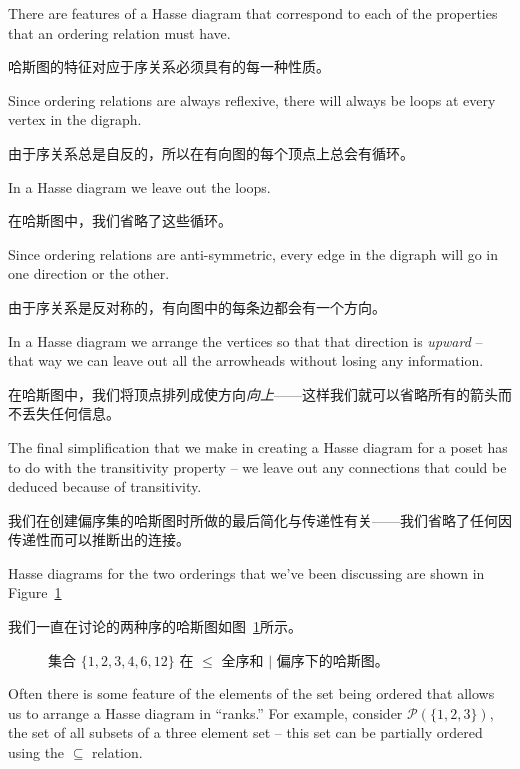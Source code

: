 There
are features of a Hasse diagram that correspond to each of the 
properties that an ordering relation must have.

哈斯图的特征对应于序关系必须具有的每一种性质。

Since ordering relations are always reflexive, there will always 
be loops at every vertex in the digraph.

由于序关系总是自反的，所以在有向图的每个顶点上总会有循环。

In a Hasse diagram we
leave out the loops.

在哈斯图中，我们省略了这些循环。

Since ordering relations are anti-symmetric, every edge in the digraph
will go in one direction or the other.

由于序关系是反对称的，有向图中的每条边都会有一个方向。

In a Hasse diagram we arrange
the vertices so that that direction is \emph{upward} -- that way we
can leave out all the arrowheads without losing any information.

在哈斯图中，我们将顶点排列成使方向\emph{向上}——这样我们就可以省略所有的箭头而不丢失任何信息。

The final simplification that we make in creating a Hasse diagram for
a poset has to do with the transitivity property -- we leave out any
connections that could be deduced because of transitivity.

我们在创建偏序集的哈斯图时所做的最后简化与传递性有关——我们省略了任何因传递性而可以推断出的连接。

Hasse diagrams for the two orderings that we've been discussing are 
shown in Figure~\ref{fig:hasse_diag}

我们一直在讨论的两种序的哈斯图如图~\ref{fig:hasse_diag}所示。

\begin{figure}[!hbt]

\caption[Some simple Hasse diagrams.]{Hasse diagrams of the set $\{1,2,3,4,6,12\}$ %
totally ordered by $\leq$ and partially ordered by $\mid$.}
\caption[一些简单的哈斯图。]{集合 $\{1,2,3,4,6,12\}$ 在 $\leq$ 全序和 $\mid$ 偏序下的哈斯图。}
\label{fig:hasse_diag} 
\end{figure}

Often there is some feature of the elements of the set being ordered
that allows us to arrange a Hasse diagram in ``ranks.''  For example,
consider ${\mathcal P}(\{1,2,3\})$, the set of all subsets of a three
element set -- this set can be partially ordered using the $\subseteq$ 
relation.

